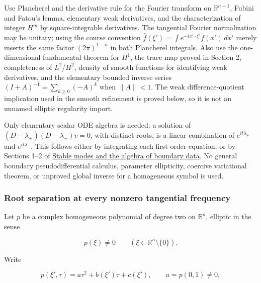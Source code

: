 \documentclass[
  11pt,
]{article}
\makeatletter
\let\ReaderOriginalAnchorStart\hyper@anchorstart
\let\ReaderOriginalAnchorEnd\hyper@anchorend
\let\ReaderPendingAliases\@empty
\def\ReaderArmAliases#1{\gdef\ReaderPendingAliases{#1}}
\def\hyper@anchorstart#1{\ReaderIfNativeAnchorTF{#1}{\ReaderPendingAliases\global\let\ReaderPendingAliases\@empty}{}\ReaderOriginalAnchorStart{#1}}
\makeatother
\begin{document}
Use Plancherel and the derivative rule for the Fourier transform on
\(\mathbb R^{n-1}\), Fubini and Fatou's lemma, elementary weak
derivatives, and the characterization of integer \(H^m\) by
square-integrable derivatives. The tangential Fourier normalization may
be unitary; using the course convention
\(\widehat f(\xi')=\int e^{-ix'\cdot\xi'}f(x')\,dx'\) merely inserts the
same factor \((2\pi)^{1-n}\) in both Plancherel integrals. Also use the
one-dimensional fundamental theorem for \(H^1\), the trace map proved in
Section 2, completeness of \(L^2\)/\(H^2\), density of smooth functions
for identifying weak derivatives, and the elementary bounded inverse
series \((I+A)^{-1}=\sum_{k\geq0}(-A)^k\) when \(\|A\|<1\). The weak
difference-quotient implication used in the smooth refinement is proved
below, so it is not an unnamed elliptic regularity import.

Only elementary scalar ODE algebra is needed: a solution of
\((D-\lambda_+)(D-\lambda_-)v=0\), with distinct roots, is a linear
combination of \(e^{it\lambda_+}\) and \(e^{it\lambda_-}\). This follows
either by integrating each first-order equation, or by Sections 1--2 of
\href{stable-boundary-models.pdf}{Stable modes and the algebra of
boundary data}. No general boundary pseudodifferential calculus,
parameter ellipticity, coercive variational theorem, or unproved global
inverse for a homogeneous symbol is used.

\ReaderArmAliases{\ReaderOriginalAnchorStart{cm1-root-separation-at-every-nonzero-tangential-frequency}\ReaderOriginalAnchorEnd\begingroup\expandafter\def\csname @currentHref\endcsname{cm1-root-separation-at-every-nonzero-tangential-frequency}\label{cm1-root-separation-at-every-nonzero-tangential-frequency}\endgroup\ReaderOriginalAnchorStart{root-separation-at-every-nonzero-tangential-frequency}\ReaderOriginalAnchorEnd}
\subsubsection{Root separation at every nonzero tangential
frequency}\label{root-separation-at-every-nonzero-tangential-frequency}

Let \(p\) be a complex homogeneous polynomial of degree two on
\(\mathbb R^n\), elliptic in the sense

\[
p(\xi)\ne0\qquad(\xi\in\mathbb R^n\setminus\{0\}).
\]

Write

\[
p(\xi',\tau)=a\tau^2+b(\xi')\tau+c(\xi'),\qquad a=p(0,1)\ne0,
\]
\end{document}
